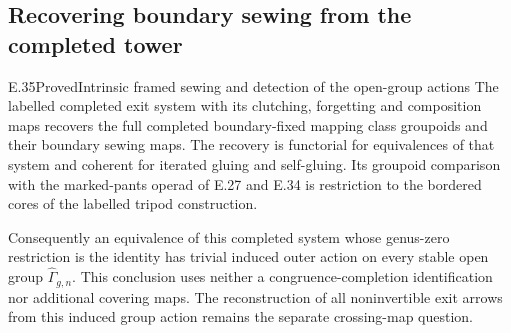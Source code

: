\subsection{Recovering boundary sewing from the completed tower}

\begin{result}{E.35}{Proved}{Intrinsic framed sewing and detection of the open-group actions}
The labelled completed exit system with its clutching,
forgetting and composition maps recovers the full completed
boundary-fixed mapping class groupoids and their boundary
sewing maps.  The recovery is functorial for equivalences
of that system and coherent for iterated gluing and
self-gluing.  Its groupoid comparison with the marked-pants
operad of E.27 and E.34 is restriction to the bordered
cores of the labelled tripod construction.

Consequently an equivalence of this completed system whose
genus-zero restriction is the identity has trivial induced
outer action on every stable open group
$\widehat\Gamma_{g,n}$.  This conclusion uses neither a
congruence-completion identification nor additional covering
maps.  The reconstruction of all noninvertible exit arrows
from this induced group action remains the separate
crossing-map question.
\end{result}
